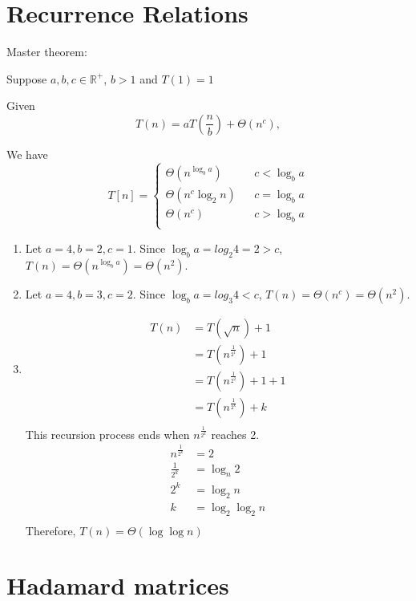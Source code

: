 \documentclass[11pt]{article}
\begin{document}
  \newpage
  \section{Recurrence Relations}
 Master theorem:
 
Suppose $a, b, c \in \mathbb{R}^+$, $b > 1$ and $T(1)=1$

Given
 \begin{equation*}
 T(n) = aT(\frac{n}{b}) + \Theta(n^c),
 \end{equation*}
 
 We have
\[
 T[n]=\left\{
\begin{array}{lcl}
\Theta(n^{\log_ba})      &      & c < \log_ba\\
\Theta(n^c\log_2n)    &      & c = \log_ba\\
\Theta(n^c)     &      & c > \log_ba\\
\end{array} \right. 
\]

\renewcommand{\labelenumi}{(\alph{enumi})}
\begin{enumerate}
	\item 
	Let $a=4, b=2, c=1$. Since $\log_ba = log_2 4 = 2 > c$, $T(n) = \Theta(n^{\log_ba}) = \Theta(n^2)$.
	\item 
	Let $a=4, b=3, c=2$. Since $\log_ba = log_3 4 < c$, $T(n) = \Theta(n^c) = \Theta(n^2)$.
	\item
	\begin{align*}
		T(n) &= T(\sqrt{n}) + 1 \\
			&= T(n^\frac{1}{2^1}) + 1 \\
			&= T(n^\frac{1}{2^2}) + 1 + 1 \\
			&= T(n^\frac{1}{2^k}) + k \\
	\end{align*}
	This recursion process ends when $n^\frac{1}{2^k}$ reaches 2.
	\begin{align*}
		n^\frac{1}{2^k} &= 2 \\
		\frac{1}{2^k} &= \log_n2  \\
		2^k &= \log_2n \\
		k &= \log_2 \log_2n  \\
	\end{align*}
	Therefore, $T(n) = \Theta(\log \log n)$
\end{enumerate}


  \newpage
  \section{Hadamard matrices}
  
\end{document}
